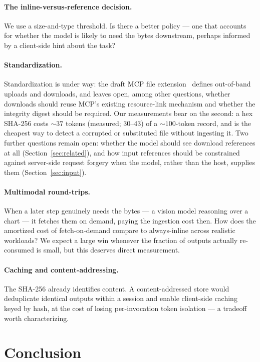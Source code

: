 \documentclass[11pt]{article}
\begin{document}
\paragraph{The inline-versus-reference decision.} We use a size-and-type threshold. Is there a better policy --- one that accounts for whether the model is likely to need the bytes downstream, perhaps informed by a client-side hint about the task?

\paragraph{Standardization.} Standardization is under way: the draft MCP file extension~\citep{mcpfiles} defines out-of-band uploads and downloads, and leaves open, among other questions, whether downloads should reuse MCP's existing resource-link mechanism and whether the integrity digest should be required. Our measurements bear on the second: a hex SHA-256 costs ${\sim}37$ tokens (measured; 30--43) of a ${\sim}100$-token record, and is the cheapest way to detect a corrupted or substituted file without ingesting it. Two further questions remain open: whether the model should see download references at all (Section~\ref{sec:related}), and how input references should be constrained against server-side request forgery when the model, rather than the host, supplies them (Section~\ref{sec:input}).

\paragraph{Multimodal round-trips.} When a later step genuinely needs the bytes --- a vision model reasoning over a chart --- it fetches them on demand, paying the ingestion cost then. How does the amortized cost of fetch-on-demand compare to always-inline across realistic workloads? We expect a large win whenever the fraction of outputs actually re-consumed is small, but this deserves direct measurement.

\paragraph{Caching and content-addressing.} The SHA-256 already identifies content. A content-addressed store would deduplicate identical outputs within a session and enable client-side caching keyed by hash, at the cost of losing per-invocation token isolation --- a tradeoff worth characterizing.

\section{Conclusion}\label{sec:conclusion}
\end{document}
